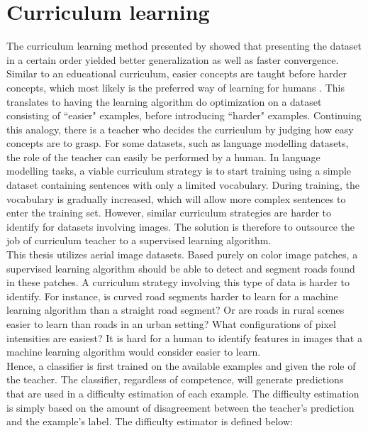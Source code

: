 \section{Curriculum learning}
\label{sec:curriculum_Learning}
The curriculum learning method presented by \cite{Bengio_curriculumlearning} showed that presenting the dataset in a certain order yielded better generalization as well as faster convergence. Similar to an educational curriculum, easier concepts are taught before harder concepts, which most likely is the preferred way of learning for humans \citep{Khan_human_teach}. This translates to having the learning algorithm do optimization on a dataset consisting of ``easier" examples, before introducing ``harder" examples. Continuing this analogy, there is a teacher who decides the curriculum by judging how easy concepts are to grasp. For some datasets, such as language modelling datasets, the role of the teacher can easily be performed by a human. In language modelling tasks, a viable curriculum strategy is to start training using a simple dataset containing sentences with only a limited vocabulary. During training, the vocabulary is gradually increased, which will allow more complex sentences to enter the training set. However, similar curriculum strategies are harder to identify for  datasets involving images. The solution is therefore to outsource the job of curriculum teacher to a supervised learning algorithm.  \\

This thesis utilizes aerial image datasets. Based purely on color image patches, a supervised learning algorithm should be able to detect and segment roads found in these patches. A curriculum strategy involving this type of data is harder to identify. For instance, is curved road segments harder to learn for a machine learning algorithm than a straight road segment? Or are roads in rural scenes easier to learn than roads in an urban setting? What configurations of pixel intensities are easiest? It is hard for a human to identify features in images that a machine learning algorithm would consider easier to learn. \\


Hence, a classifier is first trained on the available examples and given the role of the teacher. The classifier, regardless of competence, will generate predictions that are used in a difficulty estimation of each example. The difficulty estimation is simply based on the amount of disagreement between the teacher's prediction and the example's label. The difficulty estimator is defined below:  \\

